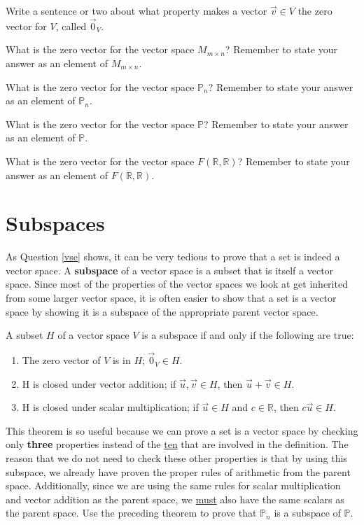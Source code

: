 \bq
\be
\item Write a sentence or two about what property makes a vector $\vec{v} \in V$ the zero vector for $V$, called $\vec{0}_V$.
\item What is the zero vector for the vector space $M_{m \times n}$? Remember to state your answer as an element of $M_{m \times n}$.
\item What is the zero vector for the vector space $\mathbb{P}_n$? Remember to state your answer as an element of $\mathbb{P}_n$.
\item What is the zero vector for the vector space $\mathbb{P}$? Remember to state your answer as an element of $\mathbb{P}$.
\item What is the zero vector for the vector space $F(\mathbb{R},\mathbb{R})$? Remember to state your answer as an element of $F(\mathbb{R},\mathbb{R})$.
\ee
\eq
\section{Subspaces}

As Question \ref{vse} shows, it can be very tedious to prove that a set is indeed a vector space. A \textbf{subspace} of a vector space is a subset that is itself a vector space. Since most of the properties of the vector spaces we look at get inherited from some larger vector space, it is often easier to show that a set is a vector space by showing it is a subspace of the appropriate parent vector space.

\begin{theorem}
A subset $H$ of a vector space $V$ is a subspace if and only if the following are true: %
\begin{enumerate}
\item The zero vector of $V$ is in $H$; $\vec{0}_V \in H$.
\item H is closed under vector addition; if $\vec{u}, \vec{v} \in H$, then $\vec{u}+\vec{v}\in H$.
\item H is closed under scalar multiplication; if $\vec{u} \in H$ and $c \in \mathbb{R}$, then $c\vec{u} \in H$.
\end{enumerate}
\end{theorem}
This theorem is so useful because we can prove a set is a vector space by checking only \textbf{three} properties instead of the \underline{ten} that are involved in the definition. The reason that we do not need to check these other properties is that by using this subspace, we already have proven the proper rules of arithmetic from the parent space. Additionally, since we are using the same rules for scalar multiplication and vector addition as the parent space, we \underline{must} also have the same scalars as the parent space.
\bq Use the preceding theorem to prove that $\mathbb{P}_n$ is a subspace of $\mathbb{P}$.
\eq

